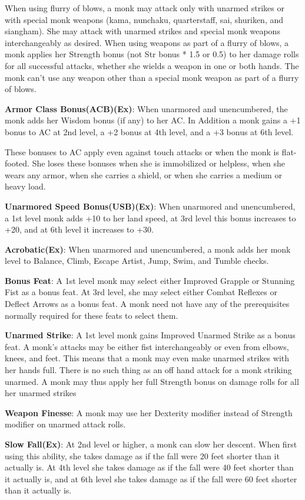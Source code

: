 When using flurry of blows, a monk may attack only with unarmed strikes or with special monk weapons (kama, nunchaku, quarterstaff, sai, shuriken, and siangham). She may attack with unarmed strikes and special monk weapons interchangeably as desired. When using weapons as part of a flurry of blows, a monk applies her Strength bonus (not Str bonus * 1.5 or 0.5) to her damage rolls for all successful attacks, whether she wields a weapon in one or both hands. The monk can’t use any weapon other than a special monk weapon as part of a flurry of blows.

\textbf{Armor Class Bonus(ACB)(Ex)}: When unarmored and unencumbered, the monk adds her Wisdom bonus (if any) to her AC. In Addition a monk gains a +1 bonus to AC at 2nd level, a +2 bonus at 4th level, and a +3 bonus at 6th level.

These bonuses to AC apply even against touch attacks or when the monk is flat-footed. She loses these bonuses when she is immobilized or helpless, when she wears any armor, when she carries a shield, or when she carries a medium or heavy load.

\textbf{Unarmored Speed Bonus(USB)(Ex)}: When unarmored and unencumbered, a 1st level monk adds +10 to her land speed, at 3rd level this bonus increases to +20, and at 6th level it increases to +30.

\textbf{Acrobatic(Ex)}: When unarmored and unencumbered, a monk adds her monk level to Balance, Climb, Escape Artist, Jump, Swim, and Tumble checks.

\textbf{Bonus Feat}: A 1st level monk may select either Improved Grapple or Stunning Fist as a bonus feat. At 3rd level, she may select either Combat Reflexes or Deflect Arrows as a bonus feat. A monk need not have any of the prerequisites normally required for these feats to select them.

\textbf{Unarmed Strike}: A 1st level monk gains Improved Unarmed Strike as a bonus feat. A monk's attacks may be either fist interchangeably or even from elbows, knees, and feet. This means that a monk may even make unarmed strikes with her hands full. There is no such thing as an off hand attack for a monk striking unarmed. A monk may thus apply her full Strength bonus on damage rolls for all her unarmed strikes

\textbf{Weapon Finesse}: A monk may use her Dexterity modifier instead of Strength modifier on unarmed attack rolls. 

\textbf{Slow Fall(Ex)}: At 2nd level or higher, a monk can slow her descent. When first using this ability, she takes damage as if the fall were 20 feet shorter than it actually is. At 4th level she takes damage as if the fall were 40 feet shorter than it actually is, and at 6th level she takes damage as if the fall were 60 feet shorter than it actually is.


